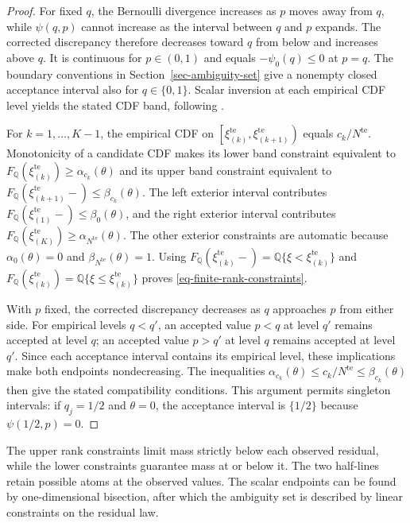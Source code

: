 \documentclass[review,11pt,3p,authoryear,nopreprintline]{elsarticle}
\begin{document}
\begin{proof}
  For fixed $q$, the Bernoulli divergence increases as $p$ moves away from $q$, while $\psi(q,p)$ cannot increase as the interval between $q$ and $p$ expands. The corrected discrepancy therefore decreases toward $q$ from below and increases above $q$. It is continuous for $p\in(0,1)$ and equals $-\psi_0(q)\le0$ at $p=q$. The boundary conventions in Section~\ref{sec-ambiguity-set} give a nonempty closed acceptance interval also for $q\in\{0,1\}$. Scalar inversion at each empirical CDF level yields the stated CDF band, following \citet[Supplement, Section~S.6]{L.J23}.

  For $k=1,\ldots,K-1$, the empirical CDF on $\left[\xi_{(k)}^{\mathrm{te}},\xi_{(k+1)}^{\mathrm{te}}\right)$ equals $c_k/N^{\mathrm{te}}$. Monotonicity of a candidate CDF makes its lower band constraint equivalent to $F_{\mathbb Q}\left(\xi_{(k)}^{\mathrm{te}}\right)\ge\alpha_{c_k}(\theta)$ and its upper band constraint equivalent to $F_{\mathbb Q}\left(\xi_{(k+1)}^{\mathrm{te}}-\right)\le\beta_{c_k}(\theta)$. The left exterior interval contributes $F_{\mathbb Q}\left(\xi_{(1)}^{\mathrm{te}}-\right)\le\beta_0(\theta)$, and the right exterior interval contributes $F_{\mathbb Q}\left(\xi_{(K)}^{\mathrm{te}}\right)\ge\alpha_{N^{\mathrm{te}}}(\theta)$. The other exterior constraints are automatic because $\alpha_0(\theta)=0$ and $\beta_{N^{\mathrm{te}}}(\theta)=1$. Using $F_{\mathbb Q}\left(\xi_{(k)}^{\mathrm{te}}-\right)=\mathbb Q\{\xi<\xi_{(k)}^{\mathrm{te}}\}$ and $F_{\mathbb Q}\left(\xi_{(k)}^{\mathrm{te}}\right)=\mathbb Q\{\xi\le \xi_{(k)}^{\mathrm{te}}\}$ proves \eqref{eq-finite-rank-constraints}.

  With $p$ fixed, the corrected discrepancy decreases as $q$ approaches $p$ from either side. For empirical levels $q<q'$, an accepted value $p<q$ at level $q'$ remains accepted at level $q$; an accepted value $p>q'$ at level $q$ remains accepted at level $q'$. Since each acceptance interval contains its empirical level, these implications make both endpoints nondecreasing. The inequalities $\alpha_{c_k}(\theta)\le c_k/N^{\mathrm{te}}\le\beta_{c_k}(\theta)$ then give the stated compatibility conditions. This argument permits singleton intervals: if $q_j=1/2$ and $\theta=0$, the acceptance interval is $\{1/2\}$ because $\psi(1/2,p)=0$.
\end{proof}

The upper rank constraints limit mass strictly below each observed residual, while the lower constraints guarantee mass at or below it. The two half-lines retain possible atoms at the observed values. The scalar endpoints can be found by one-dimensional bisection, after which the ambiguity set is described by linear constraints on the residual law.
\end{document}
